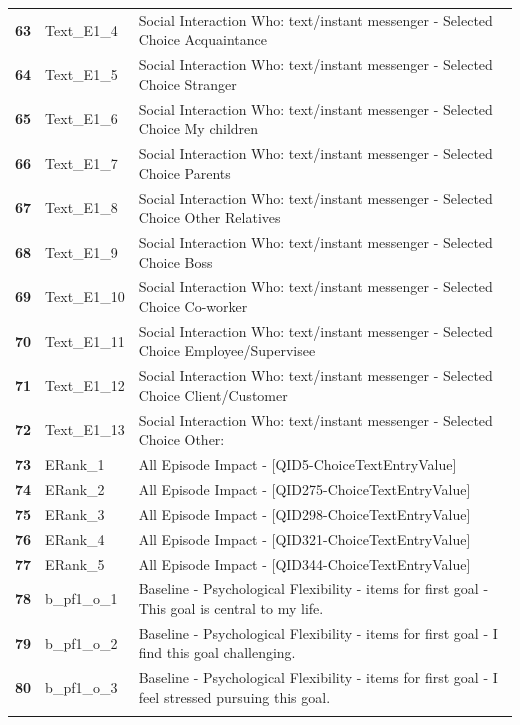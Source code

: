 \documentclass[
  letterpaper,
  DIV=11,
  numbers=noendperiod]{scrartcl}
\begin{document}
\begin{longtable}[t]{>{}cll}
\textbf{63} & Text\_E1\_4 & Social Interaction Who: text/instant messenger - Selected Choice Acquaintance\\
\textbf{64} & Text\_E1\_5 & Social Interaction Who: text/instant messenger - Selected Choice Stranger\\
\textbf{65} & Text\_E1\_6 & Social Interaction Who: text/instant messenger - Selected Choice My children\\
\addlinespace
\textbf{66} & Text\_E1\_7 & Social Interaction Who: text/instant messenger - Selected Choice Parents\\
\textbf{67} & Text\_E1\_8 & Social Interaction Who: text/instant messenger - Selected Choice Other Relatives\\
\textbf{68} & Text\_E1\_9 & Social Interaction Who: text/instant messenger - Selected Choice Boss\\
\textbf{69} & Text\_E1\_10 & Social Interaction Who: text/instant messenger - Selected Choice Co-worker\\
\textbf{70} & Text\_E1\_11 & Social Interaction Who: text/instant messenger - Selected Choice Employee/Supervisee\\
\addlinespace
\textbf{71} & Text\_E1\_12 & Social Interaction Who: text/instant messenger - Selected Choice Client/Customer\\
\textbf{72} & Text\_E1\_13 & Social Interaction Who: text/instant messenger - Selected Choice Other:\\
\textbf{73} & ERank\_1 & All Episode Impact - [QID5-ChoiceTextEntryValue]\\
\textbf{74} & ERank\_2 & All Episode Impact - [QID275-ChoiceTextEntryValue]\\
\textbf{75} & ERank\_3 & All Episode Impact - [QID298-ChoiceTextEntryValue]\\
\addlinespace
\textbf{76} & ERank\_4 & All Episode Impact - [QID321-ChoiceTextEntryValue]\\
\textbf{77} & ERank\_5 & All Episode Impact - [QID344-ChoiceTextEntryValue]\\
\textbf{78} & b\_pf1\_o\_1 & Baseline - Psychological Flexibility - items for first goal - This goal is central to my life.\\
\textbf{79} & b\_pf1\_o\_2 & Baseline - Psychological Flexibility - items for first goal - I find this goal challenging.\\
\textbf{80} & b\_pf1\_o\_3 & Baseline - Psychological Flexibility - items for first goal - I feel stressed pursuing this goal.\\
\addlinespace

\end{longtable}
\end{document}
